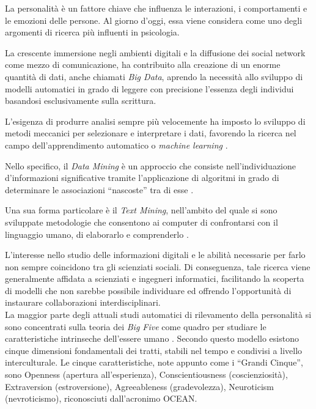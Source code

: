 La personalità è un fattore chiave che influenza le interazioni, i comportamenti e le emozioni delle persone. Al giorno d'oggi, essa viene considera come uno degli argomenti di ricerca più influenti in psicologia.

La crescente immersione negli ambienti digitali e la diffusione dei social network come mezzo di comunicazione, ha contribuito alla creazione di un enorme quantità di dati, anche chiamati \emph{Big Data}, aprendo la necessità allo sviluppo di modelli automatici in grado di leggere con precisione l'essenza degli individui basandosi esclusivamente sulla scrittura.

L'esigenza di produrre analisi sempre più velocemente ha imposto lo sviluppo di metodi meccanici per selezionare e interpretare i dati, favorendo la ricerca nel campo dell'apprendimento automatico o \emph{machine learning} \cite{samuel1959some}.

Nello specifico, il \emph{Data Mining} è un approccio che consiste nell'individuazione d’informazioni significative tramite l'applicazione di algoritmi in grado di determinare le associazioni ``nascoste'' tra di esse  \cite{chakrabarti2006data,franklin2005elements}. 

Una sua forma particolare è il \emph{Text Mining}, nell'ambito del quale si sono sviluppate metodologie che consentono ai computer di confrontarsi con il linguaggio umano, di elaborarlo e comprenderlo \cite{tan1999text}.

L'interesse nello studio delle informazioni digitali e le abilità necessarie per farlo non sempre coincidono tra gli scienziati sociali. Di conseguenza, tale ricerca viene generalmente affidata a scienziati e ingegneri informatici, facilitando la scoperta di modelli che non sarebbe possibile individuare ed offrendo l'opportunità di instaurare collaborazioni interdisciplinari.
\\

La maggior parte degli attuali studi automatici di rilevamento della personalità si sono concentrati sulla teoria dei \emph{Big Five} come quadro per studiare le caratteristiche intrinseche dell'essere umano \cite{barrick1991big}.
Secondo questo modello esistono cinque dimensioni fondamentali dei tratti, stabili nel tempo e condivisi a livello interculturale. Le cinque caratteristiche, note appunto come i ``Grandi Cinque'', sono Openness (apertura all'esperienza), Conscientiousness (coscienziosità), Extraversion (estroversione), Agreeableness (gradevolezza), Neuroticism (nevroticismo), riconosciuti dall'acronimo OCEAN.

